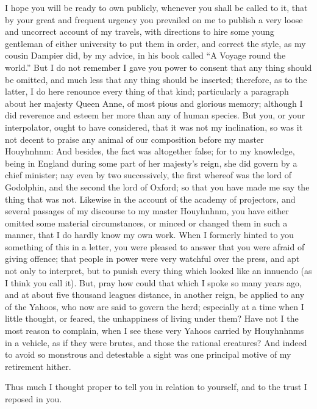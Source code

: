 

\label{acknow}

I hope you will be ready to own publicly, whenever you shall be called to it, that by your great and frequent urgency you prevailed on me to publish a very loose and uncorrect account of my travels, with directions to hire some young gentleman of either university to put them in order, and correct the style, as my cousin Dampier did, by my advice, in his book called “A Voyage round the world.”  But I do not remember I gave you power to consent that any thing should be omitted, and much less that any thing should be inserted; therefore, as to the latter, I do here renounce every thing of that kind; particularly a paragraph about her majesty Queen Anne, of most pious and glorious memory; although I did reverence and esteem her more than any of human species.  But you, or your interpolator, ought to have considered, that it was not my inclination, so was it not decent to praise any animal of our composition before my master Houyhnhnm: And besides, the fact was altogether false; for to my knowledge, being in England during some part of her majesty’s reign, she did govern by a chief minister; nay even by two successively, the first whereof was the lord of Godolphin, and the second the lord of Oxford; so that you have made me say the thing that was not.  Likewise in the account of the academy of projectors, and several passages of my discourse to my master Houyhnhnm, you have either omitted some material circumstances, or minced or changed them in such a manner, that I do hardly know my own work.  When I formerly hinted to you something of this in a letter, you were pleased to answer that you were afraid of giving offence; that people in power were very watchful over the press, and apt not only to interpret, but to punish every thing which looked like an innuendo (as I think you call it).  But, pray how could that which I spoke so many years ago, and at about five thousand leagues distance, in another reign, be applied to any of the Yahoos, who now are said to govern the herd; especially at a time when I little thought, or feared, the unhappiness of living under them?  Have not I the most reason to complain, when I see these very Yahoos carried by Houyhnhnms in a vehicle, as if they were brutes, and those the rational creatures?  And indeed to avoid so monstrous and detestable a sight was one principal motive of my retirement hither.

Thus much I thought proper to tell you in relation to yourself, and to the trust I reposed in you.

